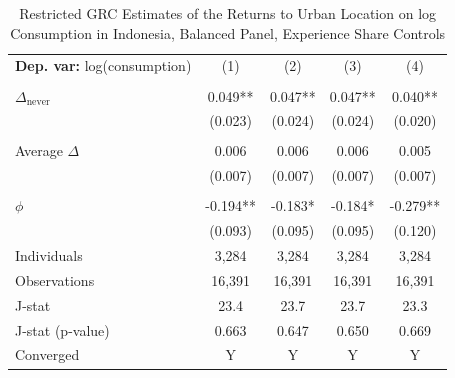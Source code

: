 \begin{table}[htbp] \centering \begin{threeparttable}
 \caption{Restricted GRC Estimates of the Returns to Urban Location on log Consumption in Indonesia, Balanced Panel, Experience Share Controls} 
 \label{tab:GRC_IDN_consumption_urban_bal_exp_sh} 
\begin{tabular}{l cccc} \toprule  \textbf{Dep. var:}  log(consumption) 
                    &\multicolumn{1}{c}{(1)}   &\multicolumn{1}{c}{(2)}   &\multicolumn{1}{c}{(3)}   &\multicolumn{1}{c}{(4)}   \\
                    &               &               &               &               \\
\addlinespace
$\Delta_{\text{never}}$&       0.049** &       0.047** &       0.047** &       0.040** \\
                    &     (0.023)   &     (0.024)   &     (0.024)   &     (0.020)   \\
                    &               &               &               &               \\
\addlinespace
Average $\Delta$    &       0.006   &       0.006   &       0.006   &       0.005   \\
                    &     (0.007)   &     (0.007)   &     (0.007)   &     (0.007)   \\
                    &               &               &               &               \\
\addlinespace
$\phi$              &      -0.194** &      -0.183*  &      -0.184*  &      -0.279** \\
                    &     (0.093)   &     (0.095)   &     (0.095)   &     (0.120)   \\
\addlinespace
Individuals         &       3,284   &       3,284   &       3,284   &       3,284   \\
Observations        &      16,391   &      16,391   &      16,391   &      16,391   \\
J-stat              &        23.4   &        23.7   &        23.7   &        23.3   \\
J-stat (p-value)    &       0.663   &       0.647   &       0.650   &       0.669   \\
Converged           &           Y   &           Y   &           Y   &           Y   \\

\end{tabular}
\end{threeparttable}
\end{table}
